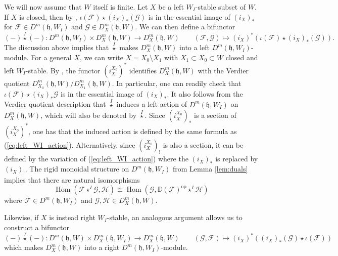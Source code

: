 \documentclass{amsart}
\newcommand{\scrF}{\mathcal{F}}
\newcommand{\scrG}{\mathcal{G}}
\newcommand{\scrH}{\mathcal{H}}
\DeclareMathOperator{\Hom}{Hom}
\newcommand{\BE}{D^m}
\newcommand{\fr}[1]{\mathfrak{#1}}
\DeclareMathOperator{\op}{op}
\newcommand{\wistar}{\stackrel{I}{\star}}
\newcommand{\DD}{\mathbb{D}}
\theoremstyle{definition}
\begin{document}
        We will now assume that $W$ itself is finite.
        Let $X$ be a left $W_I$-stable subset of $W$. If $X$ is closed, then by \cite[Corollary 6.4]{ARV}, $\iota (\scrF) \star (i_X)_* (\scrG)$ is in the essential image of $(i_X)_*$ for $\scrF \in \BE (\fr{h}, W_I)$ and $\scrG \in \BE_X (\fr{h}, W)$.
        We can then define a bifunctor
        \begin{equation}\label{eq:left_WI_action}
                (-) \wistar (-) : \BE (\fr{h}, W_I) \times \BE_X (\fr{h}, W) \to \BE_X (\fr{h}, W) \qquad (\scrF, \scrG) \mapsto (i_X)^* (\iota (\scrF) \star (i_X)_* (\scrG)).
        \end{equation}
        The discussion above implies that $\wistar$ makes $\BE_X (\fr{h}, W)$ into a left $\BE (\fr{h}, W_I)$-module.
        For a general $X$, we can write $X = X_0 \setminus X_1$ with $X_1 \subset X_0 \subset W$ closed and left $W_I$-stable.
        By \cite[Remark 5.7]{ARV}, the functor $(i_X^{X_0})^*$ identifies $\BE_X (\fr{h}, W)$ with the Verdier quotient $\BE_{X_0} (\fr{h}, W) / \BE_{X_1} (\fr{h}, W)$.
        In particular, one can readily check that $\iota (\mathcal{F}) \star (i_X)_* \mathcal{G}$ is in the essential image of $(i_X)_*$.
        It also follows from the Verdier quotient description that $\wistar$ induces a left action of $\BE (\fr{h}, W_I)$ on $\BE_X (\fr{h}, W)$, which will also be denoted by $\wistar$. 
        Since $(i_X^{X_0})_*$ is a section of $(i_X^{X_0})^*$, one has that the induced action is defined by the same formula as (\ref{eq:left_WI_action}). 
        Alternatively, since $(i_X^{X_0})_!$ is also a section, it can be defined by the variation of (\ref{eq:left_WI_action}) where the $(i_X)_*$ is replaced by $(i_X)_!$.
        The rigid monoidal structure on $\BE (\fr{h}, W_I)$ from Lemma \ref{lem:duals} implies that there are natural isomorphisms
        \begin{equation}\label{eq:rigid_hom_module}
                \Hom (\scrF \star^I \scrG, \scrH) \cong \Hom (\scrG, \DD (\scrF)^{\op} \star^I \scrH)
        \end{equation}
        where $\scrF \in \BE (\fr{h}, W_I)$ and $\scrG, \scrH \in \BE_X (\fr{h}, W)$.
        
        Likewise, if $X$ is instead right $W_I$-stable, an analogous argument allows us to construct a bifunctor 
        \[(-) \wistar (-) : \BE (\fr{h}, W) \times \BE_X (\fr{h}, W_I) \to \BE_X (\fr{h}, W) \qquad (\scrG, \scrF) \mapsto (i_X)^* ((i_X)_* (\scrG) \star \iota (\scrF))\]
        which makes $\BE_X (\fr{h}, W)$ into a right $\BE (\fr{h}, W_I)$-module.
        
\end{document}
